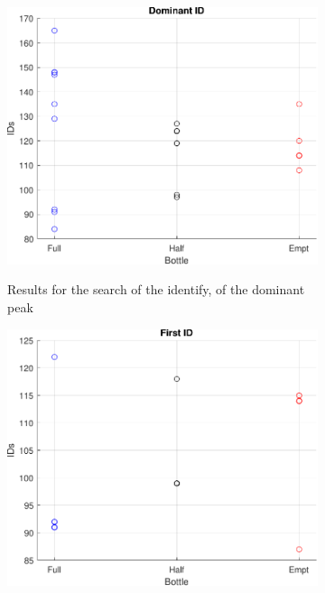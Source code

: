 \begin{figure}[]
    \centering
    \begin{subfigure}{0.45\textwidth}
        \centering
        \includegraphics[width=\linewidth]{Chapters/6CHP/Figures/ResultsuCGraphs/Sen/BotMidAcImMa18_05domID.pdf}
        \caption{Results for the search of the identify, of the dominant peak}{}
        \label{subfig:domIDACCI}
    \end{subfigure}
    \begin{subfigure}{0.45\textwidth}
        \centering
        \includegraphics[width=\linewidth]{Chapters/6CHP/Figures/ResultsuCGraphs/Sen/BotMidAcImMa18_05fID.pdf}

\end{subfigure}
\end{figure}
